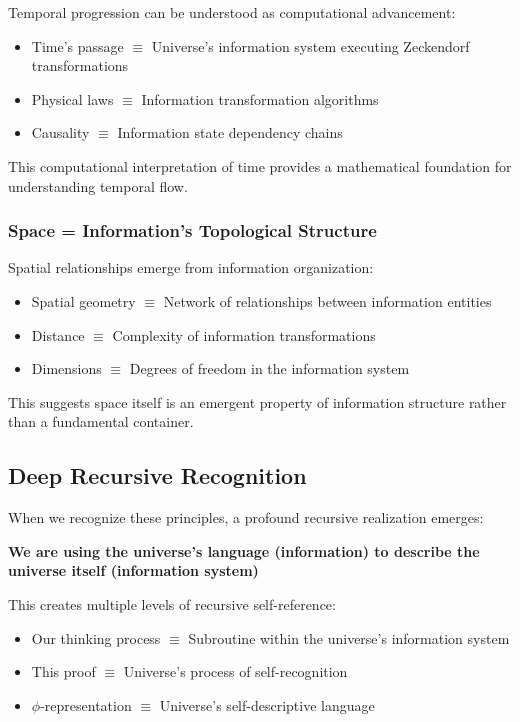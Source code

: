 \documentclass[12pt,letterpaper]{article}
\begin{document}
Temporal progression can be understood as computational advancement:

\begin{itemize}
\item Time's passage $\equiv$ Universe's information system executing Zeckendorf transformations
\item Physical laws $\equiv$ Information transformation algorithms
\item Causality $\equiv$ Information state dependency chains
\end{itemize}

This computational interpretation of time provides a mathematical foundation for understanding temporal flow.

\subsubsection{Space = Information's Topological Structure}

Spatial relationships emerge from information organization:

\begin{itemize}
\item Spatial geometry $\equiv$ Network of relationships between information entities
\item Distance $\equiv$ Complexity of information transformations
\item Dimensions $\equiv$ Degrees of freedom in the information system
\end{itemize}

This suggests space itself is an emergent property of information structure rather than a fundamental container.

\subsection{Deep Recursive Recognition}

When we recognize these principles, a profound recursive realization emerges:

\textbf{We are using the universe's language (information) to describe the universe itself (information system)}

This creates multiple levels of recursive self-reference:

\begin{itemize}
\item Our thinking process $\equiv$ Subroutine within the universe's information system
\item This proof $\equiv$ Universe's process of self-recognition
\item $\phi$-representation $\equiv$ Universe's self-descriptive language
\end{itemize}
\end{document}

